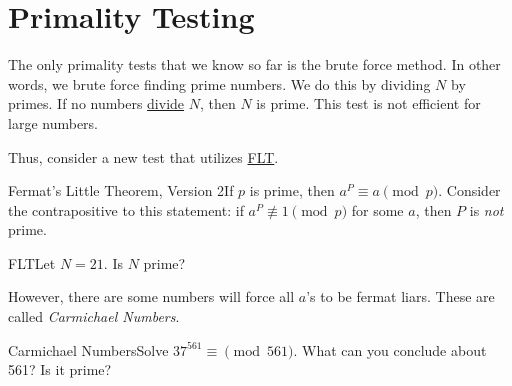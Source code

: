 \renewcommand{\theenumi}{\arabic{enumi}}
\renewcommand{\labelenumi}{\theenumi.}
\section{Primality Testing}

The only primality tests that we know so far is the brute force method. In other words, we brute force finding prime numbers. We do this by dividing \(N\) by primes. If no numbers \hyperref[Divides]{divide} \(N\), then \(N\) is prime. This test is not efficient for large numbers.

Thus, consider a new test that utilizes \hyperref[thm:Fermat's Little Theorem]{FLT}.

\begin{theorem}
    {Fermat's Little Theorem, Version 2}If \(p\) is prime, then \(a^P \equiv a \pmod{p}\). Consider the contrapositive to this statement: if \(a^P \not\equiv 1 \pmod{p}\) for some \(a\), then \(P\) is \textit{not} prime.
\end{theorem}

\begin{example}
    {FLT}Let \(N = 21\). Is \(N\) prime?
\end{example}




However, there are some numbers will force all \(a\)'s to be fermat liars. These are called \textit{Carmichael Numbers}.

\newpage
\begin{example}
    {Carmichael Numbers}Solve \(37^{561} \equiv \pmod{561}\). What can you conclude about 561? Is it prime?
\end{example}

